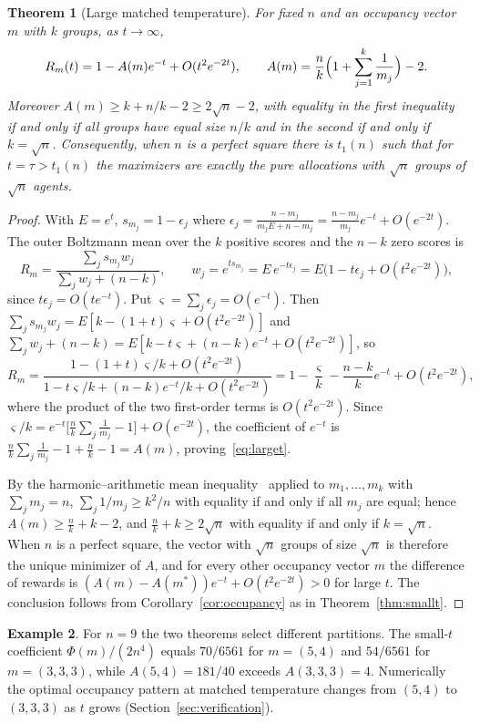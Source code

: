 \documentclass[11pt]{article}
\theoremstyle{plain}
\newtheorem{theorem}{Theorem}[section]
\theoremstyle{definition}
\newtheorem{example}[theorem]{Example}
\theoremstyle{remark}
\begin{document}
\begin{theorem}[Large matched temperature]\label{thm:larget}
For fixed $n$ and an occupancy vector $m$ with $k$ groups, as $t\to\infty$,
\begin{equation}\label{eq:larget}
 R_m(t)=1-A(m)e^{-t}+O(t^2e^{-2t}),\qquad A(m)=\frac nk\Bigl(1+\sum_{j=1}^k\frac1{m_j}\Bigr)-2 .
\end{equation}
Moreover $A(m)\ge k+n/k-2\ge2\sqrt n-2$, with equality in the first inequality if and only if all groups have equal size $n/k$ and in the second if and only if $k=\sqrt n$. Consequently, when $n$ is a perfect square there is $t_1(n)$ such that for $t=\tau>t_1(n)$ the maximizers are exactly the pure allocations with $\sqrt n$ groups of $\sqrt n$ agents.
\end{theorem}

\begin{proof}
With $E=e^t$, $s_{m_j}=1-\epsilon_j$ where $\epsilon_j=\frac{n-m_j}{m_jE+n-m_j}=\frac{n-m_j}{m_j}e^{-t}+O(e^{-2t})$. The outer Boltzmann mean over the $k$ positive scores and the $n-k$ zero scores is
\[
 R_m=\frac{\sum_js_{m_j}w_j}{\sum_jw_j+(n-k)},\qquad w_j=e^{ts_{m_j}}=E\,e^{-t\epsilon_j}=E\bigl(1-t\epsilon_j+O(t^2e^{-2t})\bigr),
\]
since $t\epsilon_j=O(te^{-t})$. Put $\varsigma=\sum_j\epsilon_j=O(e^{-t})$. Then $\sum_js_{m_j}w_j=E[k-(1+t)\varsigma+O(t^2e^{-2t})]$ and $\sum_jw_j+(n-k)=E[k-t\varsigma+(n-k)e^{-t}+O(t^2e^{-2t})]$, so
\[
 R_m=\frac{1-(1+t)\varsigma/k+O(t^2e^{-2t})}{1-t\varsigma/k+(n-k)e^{-t}/k+O(t^2e^{-2t})}
 =1-\frac{\varsigma}k-\frac{n-k}ke^{-t}+O(t^2e^{-2t}),
\]
where the product of the two first-order terms is $O(t^2e^{-2t})$. Since $\varsigma/k=e^{-t}\bigl[\frac nk\sum_j\frac1{m_j}-1\bigr]+O(e^{-2t})$, the coefficient of $e^{-t}$ is $\frac nk\sum_j\frac1{m_j}-1+\frac nk-1=A(m)$, proving~\eqref{eq:larget}.

By the harmonic--arithmetic mean inequality~\cite{HLP} applied to $m_1,\dots,m_k$ with $\sum_jm_j=n$, $\sum_j1/m_j\ge k^2/n$ with equality if and only if all $m_j$ are equal; hence $A(m)\ge\frac nk+k-2$, and $\frac nk+k\ge2\sqrt n$ with equality if and only if $k=\sqrt n$. When $n$ is a perfect square, the vector with $\sqrt n$ groups of size $\sqrt n$ is therefore the unique minimizer of $A$, and for every other occupancy vector $m$ the difference of rewards is $(A(m)-A(m^*))e^{-t}+O(t^2e^{-2t})>0$ for large $t$. The conclusion follows from Corollary~\ref{cor:occupancy} as in Theorem~\ref{thm:smallt}.
\end{proof}

\begin{example}\label{ex:nine}
For $n=9$ the two theorems select different partitions. The small-$t$ coefficient $\Phi(m)/(2n^4)$ equals $70/6561$ for $m=(5,4)$ and $54/6561$ for $m=(3,3,3)$, while $A(5,4)=181/40$ exceeds $A(3,3,3)=4$. Numerically the optimal occupancy pattern at matched temperature changes from $(5,4)$ to $(3,3,3)$ as $t$ grows (Section~\ref{sec:verification}).
\end{example}
\end{document}

